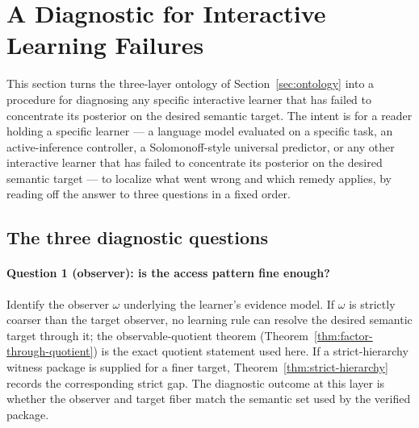 \documentclass[11pt]{article}
\theoremstyle{definition}
\theoremstyle{remark}
\theoremstyle{plain}
\theoremstyle{definition}
\begin{document}
\section{A Diagnostic for Interactive Learning Failures}
\label{app:diagnostic}
\label{sec:diagnostic}

This section turns the three-layer ontology of Section~\ref{sec:ontology} into a procedure for diagnosing any specific interactive learner that has failed to concentrate its posterior on the desired semantic target. The intent is for a reader holding a specific learner --- a language model evaluated on a specific task, an active-inference controller, a Solomonoff-style universal predictor, or any other interactive learner that has failed to concentrate its posterior on the desired semantic target --- to localize what went wrong and which remedy applies, by reading off the answer to three questions in a fixed order.

\subsection{The three diagnostic questions}
\label{app:diagnostic-questions}

\noindent{}

\medskip

\paragraph{Question 1 (observer): is the access pattern fine enough?}
Identify the observer $\omega$ underlying the learner's evidence model. If $\omega$ is strictly coarser than the target observer, no learning rule can resolve the desired semantic target through it; the observable-quotient theorem (Theorem~\ref{thm:factor-through-quotient}) is the exact quotient statement used here. If a strict-hierarchy witness package is supplied for a finer target, Theorem~\ref{thm:strict-hierarchy} records the corresponding strict gap. The diagnostic outcome at this layer is whether the observer and target fiber match the semantic set used by the verified package.
\end{document}
